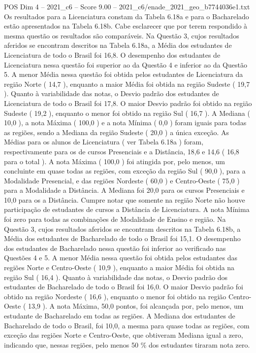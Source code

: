 \begin{textsample}{POS Dim 4 – 2021\_c6 – Score 9.00 – 2021\_c6/enade\_2021\_geo\_b7744036e1.txt}
Os resultados para a Licenciatura constam da Tabela 6.18a e para o Bacharelado estão apresentados na Tabela 6.18b.
Cabe esclarecer que por terem respondido à mesma questão os resultados são comparáveis.
Na Questão 3, cujos resultados aferidos se encontram descritos na Tabela 6.18a, a Média dos estudantes de Licenciatura de todo o Brasil foi 16,8.
O desempenho dos estudantes de Licenciatura nessa questão foi superior ao da Questão 4 e inferior ao da Questão 5.
A menor Média nessa questão foi obtida pelos estudantes de Licenciatura da região Norte ( 14,7 ), enquanto a maior Média foi obtida na região Sudeste ( 19,7 ).
Quanto à variabilidade das notas, o Desvio padrão dos estudantes de Licenciatura de todo o Brasil foi 17,8.
O maior Desvio padrão foi obtido na região Sudeste ( 19,2 ), enquanto o menor foi obtido na região Sul ( 16,7 ).
A Mediana ( 10,0 ), a nota Máxima ( 100,0 ) e a nota Mínima ( 0,0 ) foram iguais para todas as regiões, sendo a Mediana da região Sudeste ( 20,0 ) a única exceção.
As Médias para os alunos de Licenciatura ( ver Tabela 6.18a ) foram, respectivamente para os de cursos Presenciais e a Distância, 18,6 e 14,6 ( 16,8 para o total ).
A nota Máxima ( 100,0 ) foi atingida por, pelo menos, um concluinte em quase todas as regiões, com exceção da região Sul ( 90,0 ), para a Modalidade Presencial, e das regiões Nordeste ( 60,0 ) e Centro-Oeste ( 75,0 ) para a Modalidade a Distância.
A Mediana foi 20,0 para os cursos Presenciais e 10,0 para os a Distância.
Cumpre notar que somente na região Norte não houve participação de estudantes de cursos a Distância de Licenciatura.
A nota Mínima foi zero para todas as combinações de Modalidade de Ensino e região.
Na Questão 3, cujos resultados aferidos se encontram descritos na Tabela 6.18b, a Média dos estudantes de Bacharelado de todo o Brasil foi 15,1.
O desempenho dos estudantes de Bacharelado nessa questão foi inferior ao verificado nas Questões 4 e 5.
A menor Média nessa questão foi obtida pelos estudantes das regiões Norte e Centro-Oeste ( 10,9 ), enquanto a maior Média foi obtida na região Sul ( 16,4 ).
Quanto à variabilidade das notas, o Desvio padrão dos estudantes de Bacharelado de todo o Brasil foi 16,0.
O maior Desvio padrão foi obtido na região Nordeste ( 16,6 ), enquanto o menor foi obtido na região Centro-Oeste ( 13,9 ).
A nota Máxima, 50,0 pontos, foi alcançada por, pelo menos, um estudante de Bacharelado em todas as regiões.
A Mediana dos estudantes de Bacharelado de todo o Brasil, foi 10,0, a mesma para quase todas as regiões, com exceção das regiões Norte e Centro-Oeste, que obtiveram Mediana igual a zero, indicando que, nessas regiões, pelo menos 50 \% dos estudantes tiraram nota zero.

\end{textsample}
